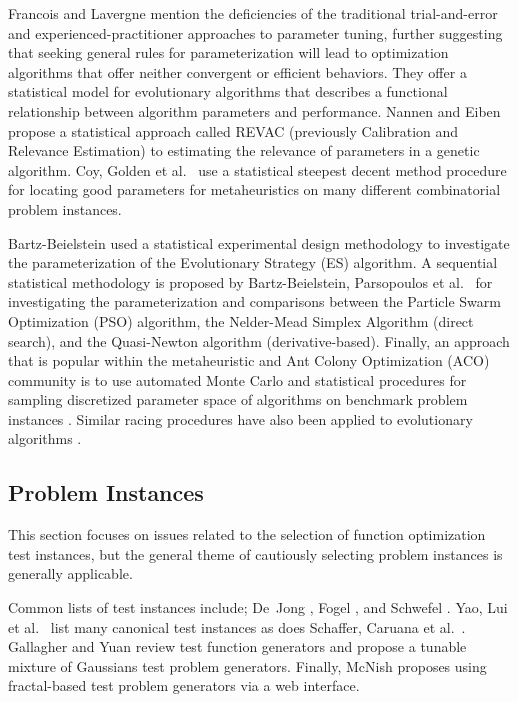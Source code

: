 Francois and Lavergne \cite{Francois2001} mention the deficiencies of the traditional trial-and-error and experienced-practitioner approaches to parameter tuning, further suggesting	that seeking general rules for parameterization will lead to optimization algorithms that offer neither convergent or efficient behaviors. They offer a statistical model for evolutionary algorithms that describes a functional relationship between algorithm parameters and performance. Nannen and Eiben \cite{Nannen2007, Nannen2006} propose a statistical approach called REVAC (previously Calibration and Relevance Estimation) to estimating the relevance of parameters in a genetic algorithm. Coy, Golden et al.\ \cite{Coy2001} use a statistical steepest decent method procedure for locating good parameters for metaheuristics on many different combinatorial problem instances.

Bartz-Beielstein \cite{Bartz-Beielstein2003} used a statistical experimental design methodology to investigate the parameterization of the Evolutionary Strategy (ES) algorithm. A sequential statistical methodology is proposed by Bartz-Beielstein, Parsopoulos et al.\ \cite{Bartz-Beielstein2004} for investigating the parameterization and comparisons between the Particle Swarm Optimization (PSO) algorithm, the Nelder-Mead Simplex Algorithm (direct search), and the Quasi-Newton algorithm (derivative-based). Finally, an approach that is popular within the metaheuristic and Ant Colony Optimization (ACO) community is to use automated Monte Carlo and statistical procedures for sampling discretized parameter space of algorithms on benchmark problem instances \cite{Birattari2002}. Similar racing procedures have also been applied to evolutionary algorithms \cite{Yuan2004}.

% 
% 
\subsection{Problem Instances}
This section focuses on issues related to the selection of function optimization test instances, but the general theme of cautiously selecting problem instances is generally applicable.

Common lists of test instances include; De~Jong \cite{Jong1975}, Fogel \cite{Fogel1995}, and Schwefel \cite{Schwefel1995}. Yao, Lui et al.\ \cite{Yao1999} list many canonical test instances as does Schaffer, Caruana et al.\ \cite{Schaffer1989}. Gallagher and Yuan \cite{Gallagher2006} review test function generators and propose a tunable mixture of Gaussians test problem generators. Finally, McNish \cite{MacNish2005} proposes using fractal-based test problem generators via a web interface.

